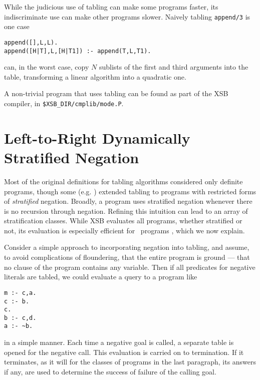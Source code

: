 While the judicious use of tabling can make some programs faster, its 
indiscriminate use can make other programs slower.  Naively tabling 
{\tt append/3} is one case
\begin{center}
\begin{minipage}{3.5in}
\begin{verbatim}
append([],L,L).
append([H|T],L,[H|T1]) :- append(T,L,T1).
\end{verbatim}						       
\end{minipage}
\end{center}
can, in the worst case, copy $N$ sublists of the first and third
arguments into the table, transforming a linear algorithm into a
quadratic one.

A non-trivial program that uses tabling can be found as part of the
XSB compiler, in \verb|$XSB_DIR/cmplib/mode.P|.

\section{Left-to-Right Dynamically Stratified Negation}

Most of the original definitions for tabling algorithms considered
only definite programs, though some (e.g. \cite{KeTo88,Seki89})
extended tabling to programs with restricted forms of {\em stratified}
negation.  Broadly, a program uses stratified negation whenever there
is no recursion through negation.  Refining this intuition can lead to
an array of stratification classes.  While XSB evaluates all programs,
whether stratified or not, its evaluation is especially efficient for
\LRD\ programs \cite{SaSW95a}, which we now explain.

Consider a simple approach to incorporating negation into tabling, and
assume, to avoid complications of floundering, that the entire program
is ground --- that no clause of the program contains any variable.
Then if all predicates for negative literals are tabled, we could
evaluate a query to a program like
\begin{center}
\begin{minipage}{1.5in}
\begin{verbatim}
m :- c,a.
c :- b.
c.
b :- c,d.
a :- ~b.
\end{verbatim}
\end{minipage}
\end{center}
in a simple manner. Each time a negative goal is called, a separate
table is opened for the negative call.  This evaluation is carried on
to termination.  If it terminates, as it will for the classes of
programs in the last paragraph, its answers if any, are used to
determine the success of failure of the calling goal. 

